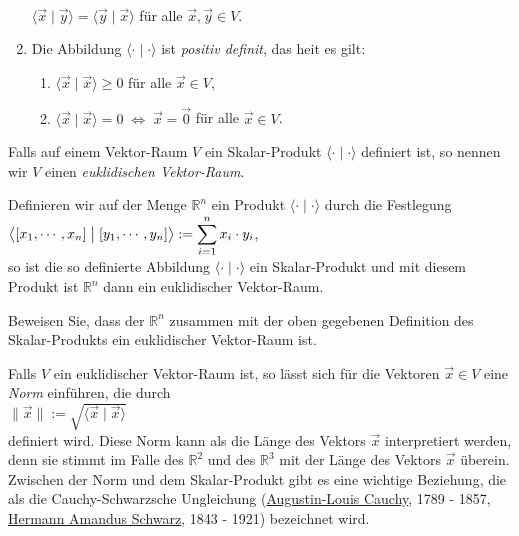 \begin{Definition}
\begin{enumerate}
        \\[0.2cm]
        \hspace*{1.3cm}
        $\langle \vec{x}\mid \vec{y} \rangle = \langle \vec{y}\mid \vec{x} \rangle$ 
        \quad f\"{u}r alle $\vec{x}, \vec{y} \in V$.
  \item Die Abbildung   $\langle \cdot\mid \cdot \rangle$ ist \emph{\color{blue}positiv definit}, das hei\3t es
        gilt:
        \begin{enumerate}
        \item $\langle \vec{x}\mid \vec{x} \rangle \geq 0$ \quad f\"{u}r alle $\vec{x} \in V$,
        \item $\langle \vec{x}\mid \vec{x} \rangle = 0 \;\Leftrightarrow\; \vec{x} = \vec{0}$ \quad f\"{u}r alle $\vec{x} \in V$.
        \end{enumerate}
  \end{enumerate} 
  Falls auf einem Vektor-Raum $V$ ein Skalar-Produkt $\langle \cdot \mid \cdot \rangle$ definiert
  ist, so nennen wir $V$ einen \emph{\color{blue}euklidischen Vektor-Raum}.  \eoxs
\end{Definition}

\example
Definieren wir auf der Menge $\mathbb{R}^n$ ein Produkt $\langle \cdot \mid \cdot \rangle$ durch die Festlegung 
\\[0.2cm]
\hspace*{1.3cm}
$\displaystyle\bigl\langle [x_1, \cdots, x_n] \bigm| [y_1, \cdots, y_n] \bigr\rangle := \sum\limits_{i=1}^n x_i \cdot y_i$,
\\[0.2cm]
so ist die so definierte Abbildung $\langle \cdot \mid \cdot \rangle$ ein Skalar-Produkt und mit
diesem Produkt ist $\mathbb{R}^n$ dann ein euklidischer Vektor-Raum.  \eoxs

\exercise
Beweisen Sie, dass der $\mathbb{R}^n$ zusammen mit der oben gegebenen Definition des Skalar-Produkts
ein euklidischer Vektor-Raum ist.  \eox


Falls $V$ ein euklidischer Vektor-Raum ist, so l\"{a}sst sich f\"{u}r die Vektoren $\vec{x} \in V$ eine \emph{\color{blue}Norm}
einf\"{u}hren, die durch
\\[0.2cm]
\hspace*{1.3cm}
$\|\vec{x}\| := \sqrt{\langle \vec{x} \mid \vec{x} \rangle}$
\\[0.2cm]
definiert wird.  Diese Norm kann als die L\"{a}nge des Vektors $\vec{x}$ interpretiert werden, denn sie
stimmt im Falle des $\mathbb{R}^2$ und des $\mathbb{R}^3$ mit der L\"{a}nge des Vektors $\vec{x}$
\"{u}berein.  Zwischen der Norm und dem Skalar-Produkt gibt es eine wichtige Beziehung, die als die
Cauchy-Schwarzsche Ungleichung
(\href{https://de.wikipedia.org/wiki/Augustin-Louis_Cauchy}{Augustin-Louis Cauchy}, 1789 - 1857,
\href{https://de.wikipedia.org/wiki/Hermann_Amandus_Schwarz}{Hermann Amandus Schwarz}, 1843 - 1921) 
bezeichnet wird.

